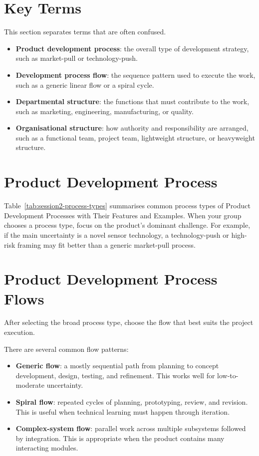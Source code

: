 \section{Key Terms}

This section separates terms that are often confused.

\begin{itemize}
    \item \textbf{Product development process}: the overall type of development strategy, such as market-pull or technology-push.
    \item \textbf{Development process flow}: the sequence pattern used to execute the work, such as a generic linear flow or a spiral cycle.
    \item \textbf{Departmental structure}: the functions that must contribute to the work, such as marketing, engineering, manufacturing, or quality.
    \item \textbf{Organisational structure}: how authority and responsibility are arranged, such as a functional team, project team, lightweight structure, or heavyweight structure.
\end{itemize}

\section{Product Development Process}

Table~\ref{tab:session2-process-types} summarises common process types of Product Development Processes with Their
Features and Examples. When your group chooses a process type, focus on the product's dominant challenge. For example, if the main uncertainty is a novel sensor technology, a technology-push or high-risk framing may fit better than a generic market-pull process.






\section{Product Development Process Flows}

After selecting the broad process type, choose the flow that best suits the project execution.

There are several common flow patterns:
\begin{itemize}
    \item \textbf{Generic flow}: a mostly sequential path from planning to concept development, design, testing, and refinement. This works well for low-to-moderate uncertainty.
    \item \textbf{Spiral flow}: repeated cycles of planning, prototyping, review, and revision. This is useful when technical learning must happen through iteration.
    \item \textbf{Complex-system flow}: parallel work across multiple subsystems followed by integration. This is appropriate when the product contains many interacting modules.
\end{itemize}

